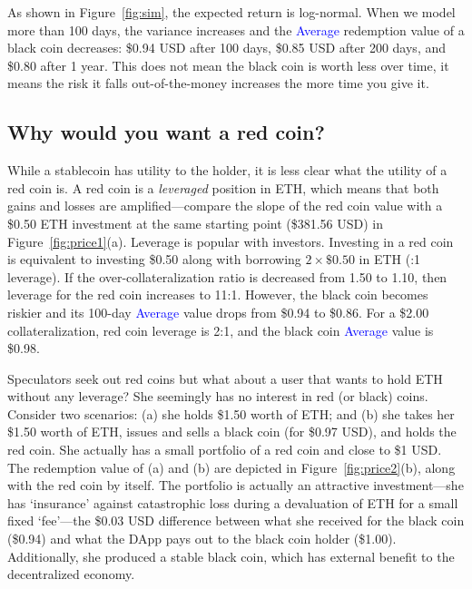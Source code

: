 As shown in Figure~\ref{fig:sim}, the expected return is log-normal. When we model more than 100 days, the variance increases and the \textcolor{blue}{Average} redemption value of a black coin decreases: \$0.94 USD after 100 days, \$0.85 USD after 200 days, and \$0.80 after 1 year. This does not mean the black coin is worth less over time, it means the risk it falls out-of-the-money increases the more time you give it. 


\subsection{Why would you want a red coin?}
\label{sec:redchar}

While a stablecoin has utility to the holder, it is less clear what the utility of a red coin is. A red coin is a \textit{leveraged} position in ETH, which means that both gains and losses are amplified---compare the slope of the red coin value with a \$0.50 ETH investment at the same starting point (\$381.56 USD) in Figure~\ref{fig:price1}(a). Leverage is popular with investors. Investing in a red coin is equivalent to investing \$0.50 along with borrowing $2\times\$0.50$ in ETH (:1 leverage). If the over-collateralization ratio is decreased from 1.50 to 1.10, then leverage for the red coin increases to 11:1. However, the black coin becomes riskier and its 100-day \textcolor{blue}{Average} value drops from \$0.94 to \$0.86. For a \$2.00 collateralization, red coin leverage is 2:1, and the black coin \textcolor{blue}{Average} value is \$0.98. 

Speculators seek out red coins but what about a user that wants to hold ETH without any leverage? She seemingly has no interest in red (or black) coins. Consider two scenarios: (a) she holds \$1.50 worth of ETH; and (b) she takes her \$1.50 worth of ETH, issues and sells a black coin (\eg for \$0.97 USD), and holds the red coin. She actually has a small portfolio of a red coin and close to \$1 USD. The redemption value of (a) and (b) are depicted in Figure~\ref{fig:price2}(b), along with the red coin by itself. The portfolio is actually an attractive investment---she has `insurance' against catastrophic loss during a devaluation of ETH for a small fixed `fee'---the \$0.03 USD difference between what she received for the black coin (\$0.94) and what the DApp pays out to the black coin holder (\$1.00). Additionally, she produced a stable black coin, which has external benefit to the decentralized economy. 

